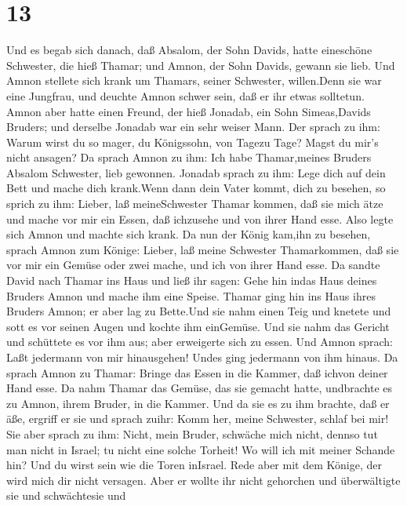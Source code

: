 \hypertarget{section-12}{%
\section{13}\label{section-12}}

 Und es begab sich danach, daß Absalom, der Sohn Davids,
hatte eineschöne Schwester, die hieß Thamar; und Amnon, der Sohn Davids,
gewann sie lieb.  Und Amnon stellete sich krank um Thamars,
seiner Schwester, willen.Denn sie war eine Jungfrau, und deuchte Amnon
schwer sein, daß er ihr etwas solltetun.  Amnon aber hatte
einen Freund, der hieß Jonadab, ein Sohn Simeas,Davids Bruders; und
derselbe Jonadab war ein sehr weiser Mann.  Der sprach zu
ihm: Warum wirst du so mager, du Königssohn, von Tagezu Tage? Magst du
mir's nicht ansagen? Da sprach Amnon zu ihm: Ich habe Thamar,meines
Bruders Absalom Schwester, lieb gewonnen.  Jonadab sprach zu
ihm: Lege dich auf dein Bett und mache dich krank.Wenn dann dein Vater
kommt, dich zu besehen, so sprich zu ihm: Lieber, laß meineSchwester
Thamar kommen, daß sie mich ätze und mache vor mir ein Essen, daß
ichzusehe und von ihrer Hand esse.  Also legte sich Amnon
und machte sich krank. Da nun der König kam,ihn zu besehen, sprach Amnon
zum Könige: Lieber, laß meine Schwester Thamarkommen, daß sie vor mir
ein Gemüse oder zwei mache, und ich von ihrer Hand esse.  Da
sandte David nach Thamar ins Haus und ließ ihr sagen: Gehe hin indas
Haus deines Bruders Amnon und mache ihm eine Speise.  Thamar
ging hin ins Haus ihres Bruders Amnon; er aber lag zu Bette.Und sie nahm
einen Teig und knetete und sott es vor seinen Augen und kochte ihm
einGemüse.  Und sie nahm das Gericht und schüttete es vor
ihm aus; aber erweigerte sich zu essen. Und Amnon sprach: Laßt jedermann
von mir hinausgehen! Undes ging jedermann von ihm hinaus. 
Da sprach Amnon zu Thamar: Bringe das Essen in die Kammer, daß ichvon
deiner Hand esse. Da nahm Thamar das Gemüse, das sie gemacht hatte,
undbrachte es zu Amnon, ihrem Bruder, in die Kammer.  Und
da sie es zu ihm brachte, daß er äße, ergriff er sie und sprach zuihr:
Komm her, meine Schwester, schlaf bei mir!  Sie aber sprach
zu ihm: Nicht, mein Bruder, schwäche mich nicht, dennso tut man nicht in
Israel; tu nicht eine solche Torheit!  Wo will ich mit
meiner Schande hin? Und du wirst sein wie die Toren inIsrael. Rede aber
mit dem Könige, der wird mich dir nicht versagen.  Aber er
wollte ihr nicht gehorchen und überwältigte sie und schwächtesie und
